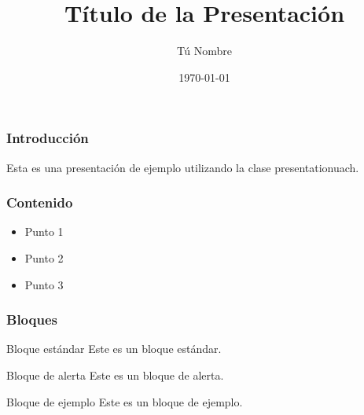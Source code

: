 \documentclass{formato/presentationuach}
\title{Título de la Presentación}
\author{Tú Nombre}
\institute{Universidad XYZ}
\date{\today}
\begin{document}
\begin{frame}
  \titlepage
\end{frame}

\begin{frame}
  \frametitle{Introducción}
  Esta es una presentación de ejemplo utilizando la clase presentationuach.
\end{frame}

\begin{frame}
  \frametitle{Contenido}
  \begin{itemize}
    \item Punto 1
    \item Punto 2
    \item Punto 3
  \end{itemize}
\end{frame}

\begin{frame}
  \frametitle{Bloques}
  \begin{block}{Bloque estándar}
    Este es un bloque estándar.
  \end{block}
  \begin{alertblock}{Bloque de alerta}
    Este es un bloque de alerta.
  \end{alertblock}
  \begin{exampleblock}{Bloque de ejemplo}
    Este es un bloque de ejemplo.
  \end{exampleblock}
\end{frame}
\end{document}
